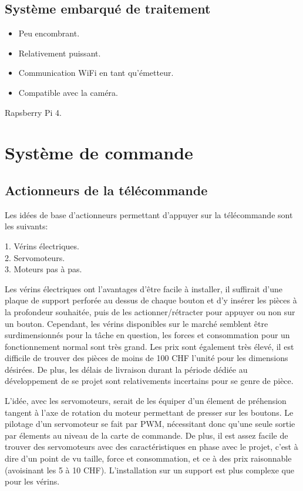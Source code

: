\subsection{Système embarqué de traitement}
\begin{itemize}
    \item Peu encombrant.
    \item Relativement puissant.
    \item Communication WiFi en tant qu'émetteur.
    \item Compatible avec la caméra.
\end{itemize}
Rapsberry Pi 4.


\section{Système de commande}
\subsection{Actionneurs de la télécommande}
Les idées de base d'actionneurs permettant d'appuyer sur la télécommande sont les suivants:
\begin{listage}
    1. Vérins électriques.\\
    2. Servomoteurs.\\
    3. Moteurs pas à pas.
\end{listage}

Les vérins électriques ont l'avantages d'être facile à installer, il suffirait d'une plaque de support perforée au dessus de chaque bouton et d'y insérer
les pièces à la profondeur souhaitée, puis de les actionner/rétracter pour appuyer ou non sur un bouton. Cependant, les vérins disponibles sur le marché semblent être surdimensionnés pour la tâche en question, les forces et
consommation pour un fonctionnement normal sont très grand. Les prix sont également très élevé, il est difficile de trouver des pièces de moins de 100 CHF l'unité
pour les dimensions désirées. De plus, les délais de livraison durant la période dédiée au développement de se projet sont relativements incertains pour se genre de pièce.

L'idée, avec les servomoteurs, serait de les équiper d'un élement de préhension tangent à l'axe de rotation du moteur permettant de presser sur les boutons.
Le pilotage d'un servomoteur se fait par PWM, nécessitant donc qu'une seule sortie par élements au niveau de la carte de commande. De plus, il est assez facile de
trouver des servomoteurs avec des caractéristiques en phase avec le projet, c'est à dire d'un point de vu taille, force et consommation, et ce à des prix
raisonnable (avoisinant les 5 à 10 CHF). L'installation sur un support est plus complexe que pour les vérins.

